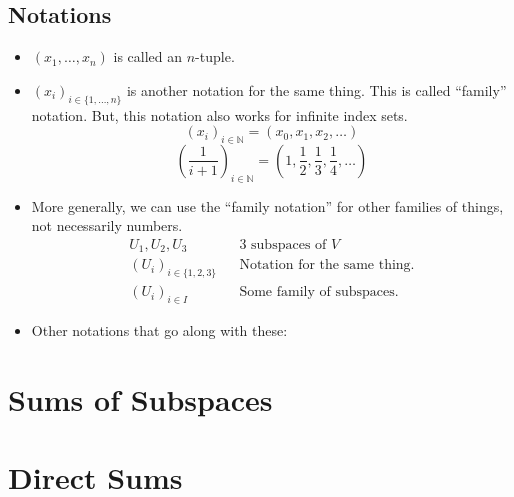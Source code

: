 \documentclass[11pt]{article}
\begin{document}
    \subsection{Notations}

    \begin{itemize}
        \item \((x_1, \dots, x_n)\) is called an $n$-tuple.
        \item \((x_i)_{i \in \{1, \dots, n\}}\) is another notation for the same thing. This is called ``family'' notation. But, this notation also works for infinite index sets. \[ (x_i)_{i \in \mathbb{N}} = (x_0, x_1, x_2, \dots) \] \[ \left( \frac{1}{i + 1} \right)_{i \in \mathbb{N}} = \left( 1, \frac{1}{2}, \frac{1}{3}, \frac{1}{4}, \dots \right) \]
        \item More generally, we can use the ``family notation'' for other families of things, not necessarily numbers. 
        \begin{align*}
            U_1, U_2, U_3 && \text{3 subspaces of $V$} \\
            (U_i)_{i \in \{ 1,2,3 \}} && \text{Notation for the same thing.} \\
            (U_i)_{i \in I} && \text{Some family of subspaces.}
        \end{align*}
        \item Other notations that go along with these:
        
    \end{itemize}

    
    \section{Sums of Subspaces}

    \section{Direct Sums}


    
\end{document}
